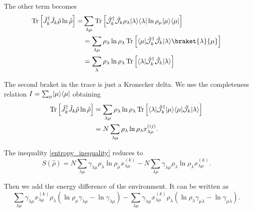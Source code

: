 The other term becomes
\begin{equation}
    \begin{split}
        \Tr\left[\hat J_{k}^\dagger \hat J_{k}\hat\rho\ln\hat\rho\right]=& \sum_{\lambda\mu}\Tr\left[\hat{\mathcal{J}}_{k}^\dagger \hat{\mathcal{J}}_{k}\rho_\lambda\ket{\lambda}\bra{\lambda}\ln\rho_\mu\ket{\mu}\bra{\mu}\right]\\
        & = \sum_{\lambda\mu}\rho_\lambda\ln\rho_\lambda\Tr\left[\bra{\mu}\hat{\mathcal{J}}_{k}^\dagger\hat{\mathcal{J}}_{k}\ket{\lambda}\braket{\lambda}{\mu}\right]\\
        &= \sum_{\lambda}\rho_\lambda\ln\rho_\lambda\Tr\left[\bra{\lambda}\hat{\mathcal{J}}_{k}^\dagger\hat{\mathcal{J}}_{k}\ket{\lambda}\right]\\
    \end{split}
\end{equation}

The second braket in the trace is just a Kronecker delta. We use the completeness relation $I = \sum_\mu\lvert\mu\rangle\langle\mu\rvert$ obtaining
\begin{equation}
    \begin{split}
        \operatorname{Tr}\left[\hat J_{k}^\dagger \hat J_{k}\hat\rho\ln\hat\rho\right]&= \sum_{\lambda\mu}\rho_\lambda\ln\rho_\lambda\operatorname{Tr}\left[\langle\lambda\rvert\hat{\mathcal{J}}_{k}^\dagger\lvert\mu\rangle\langle\mu\rvert\hat{\mathcal{J}}_{k}\lvert\lambda\rangle\right]\\
        &= N\sum_{\lambda\mu}\rho_\lambda\ln\rho_\lambda x^{(ij)}_{\lambda\mu}.\\
    \end{split}
\end{equation}


The inequality \eqref{entropy_inequality} reduces to 
\begin{equation}
    \dot S(\hat\rho) = N \sum_{\lambda\mu}\gamma_{\lambda\mu}\rho_\lambda\ln\rho_\mu x^{(k)}_{\lambda\mu} - N\sum_{\lambda\mu}\gamma_{\lambda\mu}\rho_\lambda\ln\rho_\lambda x^{(k)}_{\lambda\mu}.
\end{equation}

Then we add the energy difference of the environment. It can be written as
\begin{equation}
    \sum_{\lambda\mu}\gamma_{\lambda\mu}x^{(k)}_{\lambda\mu}\rho_\lambda\left(\ln\rho_\mu\gamma_{\lambda\mu} - \ln\gamma_{\lambda\mu}\right)  
    - \sum_{\lambda\mu}\gamma_{\lambda\mu}x^{(k)}_{\lambda\mu}\rho_\lambda\left(\ln\rho_\lambda\gamma_{\mu\lambda}- \ln\gamma_{\mu\lambda}\right) .
\end{equation}

